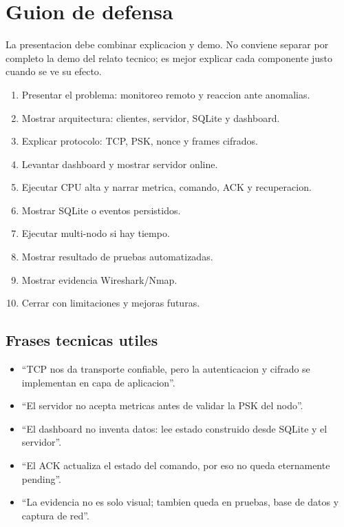 \documentclass[11pt,letterpaper]{article}
\begin{document}
\newpage
\section{Guion de defensa}

La presentacion debe combinar explicacion y demo. No conviene separar por completo
la demo del relato tecnico; es mejor explicar cada componente justo cuando se ve
su efecto.

\begin{enumerate}
  \item Presentar el problema: monitoreo remoto y reaccion ante anomalias.
  \item Mostrar arquitectura: clientes, servidor, SQLite y dashboard.
  \item Explicar protocolo: TCP, PSK, nonce y frames cifrados.
  \item Levantar dashboard y mostrar servidor online.
  \item Ejecutar CPU alta y narrar metrica, comando, ACK y recuperacion.
  \item Mostrar SQLite o eventos persistidos.
  \item Ejecutar multi-nodo si hay tiempo.
  \item Mostrar resultado de pruebas automatizadas.
  \item Mostrar evidencia Wireshark/Nmap.
  \item Cerrar con limitaciones y mejoras futuras.
\end{enumerate}

\subsection{Frases tecnicas utiles}

\begin{itemize}
  \item ``TCP nos da transporte confiable, pero la autenticacion y cifrado se implementan en capa de aplicacion''.
  \item ``El servidor no acepta metricas antes de validar la PSK del nodo''.
  \item ``El dashboard no inventa datos: lee estado construido desde SQLite y el servidor''.
  \item ``El ACK actualiza el estado del comando, por eso no queda eternamente pending''.
  \item ``La evidencia no es solo visual; tambien queda en pruebas, base de datos y captura de red''.
\end{itemize}
\end{document}

